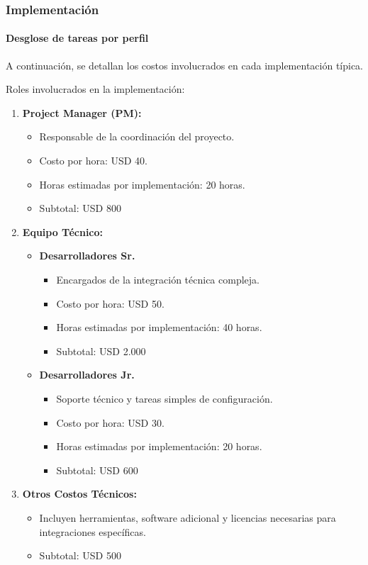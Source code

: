 \subsubsection{Implementación}

\paragraph{Desglose de tareas por perfil}

A continuación, se detallan los costos involucrados en cada implementación típica.

Roles involucrados en la implementación:

\begin{enumerate}
    \item \textbf{Project Manager (PM):}
    \begin{itemize}
        \item Responsable de la coordinación del proyecto.
        \item Costo por hora: USD 40.
        \item Horas estimadas por implementación: 20 horas.
        \item Subtotal: USD 800
    \end{itemize}

    \item \textbf{Equipo Técnico:}
    \begin{itemize}
        \item \textbf{Desarrolladores Sr.}
        \begin{itemize}
            \item Encargados de la integración técnica compleja.
            \item Costo por hora: USD 50.
            \item Horas estimadas por implementación: 40 horas.
            \item Subtotal: USD 2.000
        \end{itemize}
        
        \item \textbf{Desarrolladores Jr.}
        \begin{itemize}
            \item Soporte técnico y tareas simples de configuración.
            \item Costo por hora: USD 30.
            \item Horas estimadas por implementación: 20 horas.
            \item Subtotal: USD 600
        \end{itemize}
    \end{itemize}

    \item \textbf{Otros Costos Técnicos:}
    \begin{itemize}
        \item Incluyen herramientas, software adicional y licencias necesarias para integraciones específicas.
        \item Subtotal: USD 500
    \end{itemize}
\end{enumerate}


